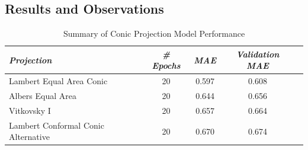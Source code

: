 \subsection{Results and Observations}

\begin{table}[ht]
    \centering
    \caption{Summary of Conic Projection Model Performance}
    \label{conic_results_table}
    \renewcommand{\arraystretch}{1.2} %
    \begin{tabular}{|l|c|c|c|c|}
        \hline
        \rowcolor[gray]{0.9}
        \textbf{\emph{Projection}}          & \textbf{\emph{\# Epochs}} & \textbf{\emph{MAE}} & \textbf{\emph{Validation MAE}} \\ \hline
        Lambert Equal Area Conic            & 20                        & 0.597               & 0.608                          \\ \hline
        Albers Equal Area                   & 20                        & 0.644               & 0.656                          \\ \hline
        Vitkovsky I                         & 20                        & 0.657               & 0.664                          \\ \hline
        Lambert Conformal Conic Alternative & 20                        & 0.670               & 0.674                          \\ \hline
    \end{tabular}
\end{table}